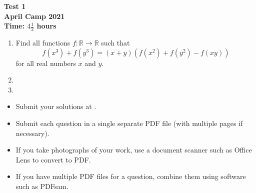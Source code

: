\documentclass{article}
\begin{document}
\thispagestyle{empty}

\begin{center}
  \textbf{\Large Test 1}
  \\ \vspace{1em}
  \textbf{\large April Camp 2021}
  \\ \vspace{1em}
  \textbf{\large Time: $4\frac{1}{2}$ hours}
\end{center}

\vspace{24pt}

\begin{enumerate}[1.]

\item %
Find all functions $f: \mathbb{R} \to \mathbb{R}$ such that
\[
  f\left( x^3 \right) + f\left( y^3 \right) = (x + y)\left( f\left( x^2 \right) + f\left( y^2 \right) - f(xy) \right)
\]
for all real numbers $x$ and $y$.


\item


\item

\end{enumerate}


\vfill
\begin{itemize}
	\item Submit your solutions at \url{}.
	\item Submit each question in a single separate PDF file (with multiple pages if necessary).
	\item If you take photographs of your work, use a document scanner such as Office Lens to convert to PDF.
	\item If you have multiple PDF files for a question, combine them using software such as PDFsam.
\end{itemize}

\vfill
\centering
\begin{BVerbatim}
\end{BVerbatim}
\end{document}
